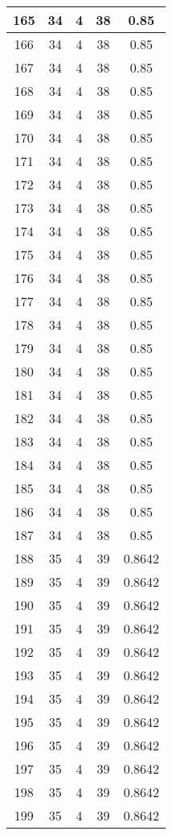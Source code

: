 \documentclass[letterpaper, 12pt]{article}
\begin{document}
\begin{longtable}{|c|c|c|c|c|}
\hline
165 & 34 & 4 & 38 & 0.85 \\
\hline
166 & 34 & 4 & 38 & 0.85 \\
\hline
167 & 34 & 4 & 38 & 0.85 \\
\hline
168 & 34 & 4 & 38 & 0.85 \\
\hline
169 & 34 & 4 & 38 & 0.85 \\
\hline
170 & 34 & 4 & 38 & 0.85 \\
\hline
171 & 34 & 4 & 38 & 0.85 \\
\hline
172 & 34 & 4 & 38 & 0.85 \\
\hline
173 & 34 & 4 & 38 & 0.85 \\
\hline
174 & 34 & 4 & 38 & 0.85 \\
\hline
175 & 34 & 4 & 38 & 0.85 \\
\hline
176 & 34 & 4 & 38 & 0.85 \\
\hline
177 & 34 & 4 & 38 & 0.85 \\
\hline
178 & 34 & 4 & 38 & 0.85 \\
\hline
179 & 34 & 4 & 38 & 0.85 \\
\hline
180 & 34 & 4 & 38 & 0.85 \\
\hline
181 & 34 & 4 & 38 & 0.85 \\
\hline
182 & 34 & 4 & 38 & 0.85 \\
\hline
183 & 34 & 4 & 38 & 0.85 \\
\hline
184 & 34 & 4 & 38 & 0.85 \\
\hline
185 & 34 & 4 & 38 & 0.85 \\
\hline
186 & 34 & 4 & 38 & 0.85 \\
\hline
187 & 34 & 4 & 38 & 0.85 \\
\hline
188 & 35 & 4 & 39 & 0.8642 \\
\hline
189 & 35 & 4 & 39 & 0.8642 \\
\hline
190 & 35 & 4 & 39 & 0.8642 \\
\hline
191 & 35 & 4 & 39 & 0.8642 \\
\hline
192 & 35 & 4 & 39 & 0.8642 \\
\hline
193 & 35 & 4 & 39 & 0.8642 \\
\hline
194 & 35 & 4 & 39 & 0.8642 \\
\hline
195 & 35 & 4 & 39 & 0.8642 \\
\hline
196 & 35 & 4 & 39 & 0.8642 \\
\hline
197 & 35 & 4 & 39 & 0.8642 \\
\hline
198 & 35 & 4 & 39 & 0.8642 \\
\hline
199 & 35 & 4 & 39 & 0.8642 \\
\hline
\end{longtable}
\end{document}
